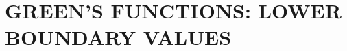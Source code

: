 \documentclass[ILW\ Notes.tex]{subfiles}
\begin{document}
\chapter{GREEN'S FUNCTIONS: LOWER BOUNDARY VALUES}\label{cptr01:GF}




% 


% 


% 




% 




% 



% 




% 



% 
\end{document}
